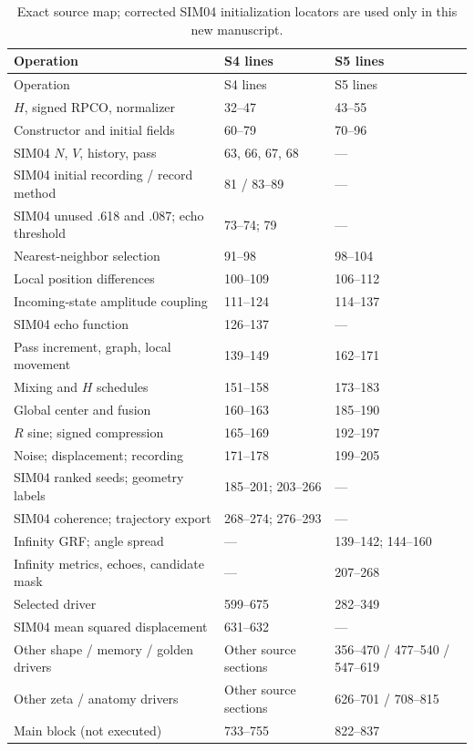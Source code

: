 \documentclass[11pt,a4paper]{article}
\begin{document}
\small
\begin{longtable}{@{}p{76mm}p{29mm}p{29mm}@{}}
\caption{Exact source map; corrected SIM04 initialization locators are used only in this new manuscript.}\label{tab:locators}\\
\toprule Operation & \textsf{S4} lines & \textsf{S5} lines\\\midrule\endfirsthead
\toprule Operation & \textsf{S4} lines & \textsf{S5} lines\\\midrule\endhead
$H$, signed RPCO, normalizer & 32--47 & 43--55\\
Constructor and initial fields & 60--79 & 70--96\\
SIM04 $N$, $V$, history, pass & 63, 66, 67, 68 & ---\\
SIM04 initial recording / record method & 81 / 83--89 & ---\\
SIM04 unused .618 and .087; echo threshold & 73--74; 79 & ---\\
Nearest-neighbor selection & 91--98 & 98--104\\
Local position differences & 100--109 & 106--112\\
Incoming-state amplitude coupling & 111--124 & 114--137\\
SIM04 echo function & 126--137 & ---\\
Pass increment, graph, local movement & 139--149 & 162--171\\
Mixing and $H$ schedules & 151--158 & 173--183\\
Global center and fusion & 160--163 & 185--190\\
$R$ sine; signed compression & 165--169 & 192--197\\
Noise; displacement; recording & 171--178 & 199--205\\
SIM04 ranked seeds; geometry labels & 185--201; 203--266 & ---\\
SIM04 coherence; trajectory export & 268--274; 276--293 & ---\\
Infinity GRF; angle spread & --- & 139--142; 144--160\\
Infinity metrics, echoes, candidate mask & --- & 207--268\\
Selected driver & 599--675 & 282--349\\
SIM04 mean squared displacement & 631--632 & ---\\
Other shape / memory / golden drivers & Other source sections & 356--470 / 477--540 / 547--619\\
Other zeta / anatomy drivers & Other source sections & 626--701 / 708--815\\
Main block (not executed) & 733--755 & 822--837\\
\bottomrule
\end{longtable}
\normalsize
\end{document}
